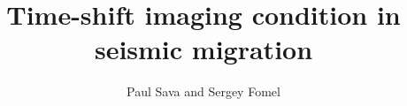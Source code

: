\title{Time-shift imaging condition in seismic migration}
\author{Paul Sava and Sergey Fomel}

\maketitle




















